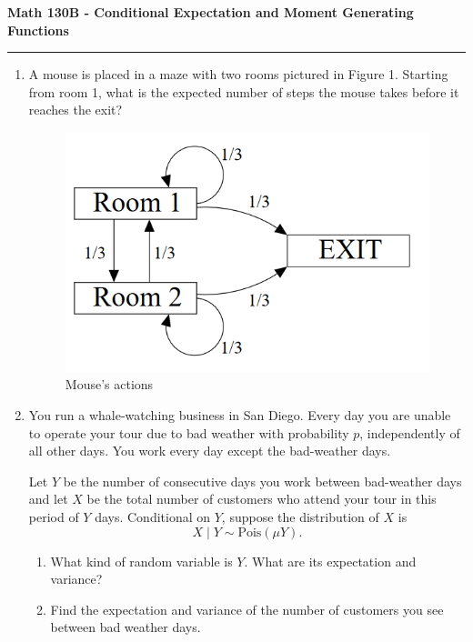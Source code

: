 \documentclass[11pt,letterpaper]{article}
\begin{document}
\begin{center}
{\bf \Large Math 130B - Conditional Expectation and Moment Generating Functions}
\vspace{0.2cm}
\hrule
\end{center}

\begin{enumerate}
	\item A mouse is placed in a maze with two rooms pictured in Figure 1. Starting from room 1, what is the expected number of steps the mouse takes before it reaches the exit?
	\begin{figure}[h]
		\centering
		\includegraphics[scale=.7]{diagram.PNG}
		\caption{Mouse's actions}
	\end{figure}

	\vfill

	\item You run a whale-watching business in San Diego.
	Every day you are unable to operate your tour due to bad weather with probability $p$, independently of all other days.
	You work every day except the bad-weather days.

	Let $Y$ be the number of consecutive days you work between bad-weather days and let $X$ be the total number of customers who attend your tour in this period of $Y$ days.
	Conditional on $Y$, suppose the distribution of $X$ is
	\[
		X\mid Y \sim \text{Pois}(\mu Y).
	\]
	\begin{enumerate}
		\item What kind of random variable is $Y$. What are its expectation and variance?
		\vfill

		\item Find the expectation and variance of the number of customers you see between bad weather days.
	\end{enumerate}


\end{enumerate}
\end{document}
